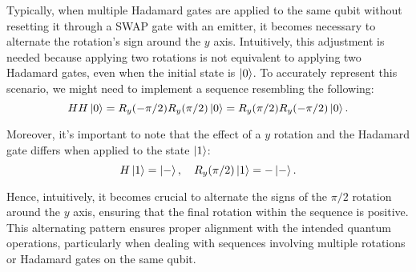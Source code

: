 Typically, when multiple Hadamard gates are applied to the same qubit without resetting it through a SWAP gate with an emitter, it becomes necessary to alternate the rotation's sign around the $y$ axis.
Intuitively, this adjustment is needed because applying two rotations is not equivalent to applying two Hadamard gates, even when the initial state is $\ket{0}$.
To accurately represent this scenario, we might need to implement a sequence resembling the following:
\begin{equation}
    H H \ket{0} =
    R_y(- \pi / 2) R_y(\pi / 2) \ket{0} =
    R_y(\pi / 2) R_y(-\pi / 2) \ket{0} .
\end{equation}

Moreover, it's important to note that the effect of a $y$ rotation and the Hadamard gate differs when applied to the state $\ket{1}$:
\begin{equation}
    H \ket{1} = \ket{-} , \quad
    R_y(\pi / 2) \ket{1} = - \ket{-} .
\end{equation}

Hence, intuitively, it becomes crucial to alternate the signs of the $\pi/2$ rotation around the $y$ axis, ensuring that the final rotation within the sequence is positive. 
This alternating pattern ensures proper alignment with the intended quantum operations, particularly when dealing with sequences involving multiple rotations or Hadamard gates on the same qubit.